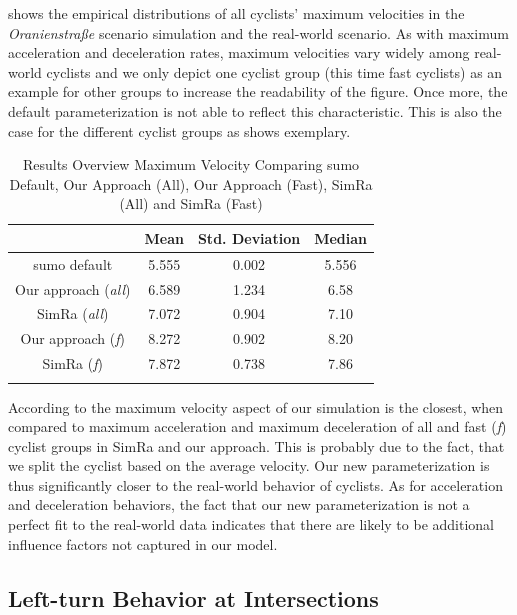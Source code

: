  shows the empirical distributions of all cyclists' maximum velocities in the \textit{Oranienstraße} scenario simulation and the real-world scenario.
As with maximum acceleration and deceleration rates, maximum velocities vary widely among real-world cyclists and we only depict one cyclist group (this time fast cyclists) as an example for other groups to increase the readability of the figure.
Once more, the default parameterization is not able to reflect this characteristic.
This is also the case for the different cyclist groups as  shows exemplary.
\begin{table}
\centering
\caption{Results Overview Maximum Velocity Comparing \ac{sumo} Default, Our Approach (All), Our Approach (Fast), SimRa (All) and SimRa (Fast)}%
\label{tab:results_overview_vel}
\begin{tabular}{cccc}
\toprule
& Mean & Std. Deviation & Median\\
\midrule
\midrule
\ac{sumo} default & \num{5.555} & \num{0.002} & \num{5.556} \\
\midrule
Our approach (\textit{all}) & \num{6.589} & \num{1.234} & \num{6.58} \\
SimRa (\textit{all}) & \num{7.072} & \num{0.904} & \num{7.10} \\
\midrule
Our approach (\textit{f}) & \num{8.272} & \num{0.902} & \num{8.20} \\
SimRa (\textit{f}) & \num{7.872} & \num{0.738} & \num{7.86} \\
\bottomrule&
\end{tabular}
\end{table}
According to  the maximum velocity aspect of our simulation is the closest, when compared to maximum acceleration and maximum deceleration of all and fast (\textit{f}) cyclist groups in SimRa and our approach.
This is probably due to the fact, that we split the cyclist based on the average velocity.
Our new parameterization is thus significantly closer to the real-world behavior of cyclists.
As for acceleration and deceleration behaviors, the fact that our new parameterization is not a perfect fit to the real-world data indicates that there are likely to be additional influence factors not captured in our model.

\subsection{Left-turn Behavior at Intersections}
\label{subsec:left-turn_behavior_at_intersections_evaluation}

